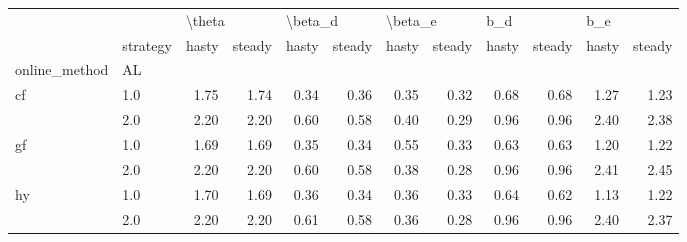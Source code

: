 \begin{tabular}{llrrrrrrrrrr}
\toprule
   & {} & \multicolumn{2}{l}{\textbackslash theta} & \multicolumn{2}{l}{\textbackslash beta\_d} & \multicolumn{2}{l}{\textbackslash beta\_e} & \multicolumn{2}{l}{b\_d} & \multicolumn{2}{l}{b\_e} \\
   & strategy &  hasty & steady &   hasty & steady &   hasty & steady & hasty & steady & hasty & steady \\
online\_method & AL &        &        &         &        &         &        &       &        &       &        \\
\midrule
cf & 1.0 &   1.75 &   1.74 &    0.34 &   0.36 &    0.35 &   0.32 &  0.68 &   0.68 &  1.27 &   1.23 \\
   & 2.0 &   2.20 &   2.20 &    0.60 &   0.58 &    0.40 &   0.29 &  0.96 &   0.96 &  2.40 &   2.38 \\
gf & 1.0 &   1.69 &   1.69 &    0.35 &   0.34 &    0.55 &   0.33 &  0.63 &   0.63 &  1.20 &   1.22 \\
   & 2.0 &   2.20 &   2.20 &    0.60 &   0.58 &    0.38 &   0.28 &  0.96 &   0.96 &  2.41 &   2.45 \\
hy & 1.0 &   1.70 &   1.69 &    0.36 &   0.34 &    0.36 &   0.33 &  0.64 &   0.62 &  1.13 &   1.22 \\
   & 2.0 &   2.20 &   2.20 &    0.61 &   0.58 &    0.36 &   0.28 &  0.96 &   0.96 &  2.40 &   2.37 \\
\bottomrule
\end{tabular}
